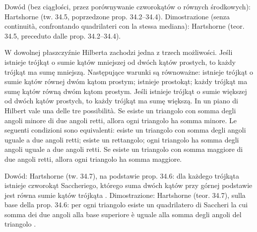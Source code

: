 Dowód (bez ciągłości, przez porównywanie czworokątów o równych środkowych): Hartshorne \cite[s. 307--309]{hartshorne_2000} (tw. 34.5, poprzedzone prop. 34.2--34.4). %
Dimostrazione (senza continuità, confrontando quadrilateri con la stessa mediana): Hartshorne \cite[p. 307--309]{hartshorne_2000} (teor. 34.5, preceduto dalle prop. 34.2--34.4). %

\begin{theorem}
	W dowolnej płaszczyźnie Hilberta zachodzi jedna z trzech możliwości. %
	Jeśli istnieje trójkąt o sumie kątów mniejszej od dwóch kątów prostych, to każdy trójkąt ma sumę mniejszą. %
	Następujące warunki są równoważne: istnieje trójkąt o sumie kątów równej dwóm kątom prostym; istnieje prostokąt; każdy trójkąt ma sumę kątów równą dwóm kątom prostym. %
	Jeśli istnieje trójkąt o sumie większej od dwóch kątów prostych, to każdy trójkąt ma sumę większą. %
	In un piano di Hilbert vale una delle tre possibilità. %
	Se esiste un triangolo con somma degli angoli minore di due angoli retti, allora ogni triangolo ha somma minore. %
	Le seguenti condizioni sono equivalenti: esiste un triangolo con somma degli angoli uguale a due angoli retti; esiste un rettangolo; ogni triangolo ha somma degli angoli uguale a due angoli retti. %
	Se esiste un triangolo con somma maggiore di due angoli retti, allora ogni triangolo ha somma maggiore. %
\end{theorem}

Dowód: Hartshorne \cite[s. 309--311]{hartshorne_2000} (tw. 34.7), na podstawie prop. 34.6: dla każdego trójkąta istnieje czworokąt Saccheriego, którego suma dwóch kątów przy górnej podstawie jest równa sumie kątów trójkąta \cite[s. 310]{hartshorne_2000}. %
Dimostrazione: Hartshorne \cite[p. 309--311]{hartshorne_2000} (teor. 34.7), sulla base della prop. 34.6: per ogni triangolo esiste un quadrilatero di Saccheri la cui somma dei due angoli alla base superiore è uguale alla somma degli angoli del triangolo \cite[p. 310]{hartshorne_2000}. %

